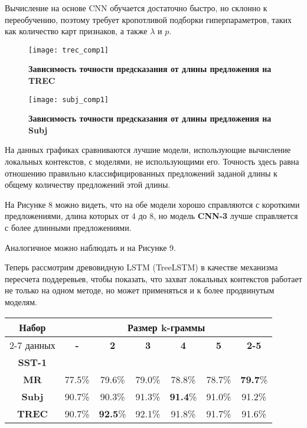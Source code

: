 Вычисление на основе CNN обучается достаточно быстро, но склонно к переобучению, поэтому требует кропотливой подборки гиперпараметров, таких как количество карт признаков, а также $\lambda$ и $p$.

\begin{figure}[H]
\texttt{[image: trec\_comp1]}
\caption{\textbf{Зависимость точности предсказания от длины предложения на TREC}}
\label{fig:context_ex}
\end{figure}

\begin{figure}[H]
\texttt{[image: subj\_comp1]}
\caption{\textbf{Зависимость точности предсказания от длины предложения на Subj}}
\label{fig:context_ex}
\end{figure}

\vspace{20mm}

На данных графиках сравниваются лучшие модели, использующие вычисление локальных контекстов, с моделями, не использующими его. Точность здесь равна отношению правильно классифицированных предложений заданой длины к общему количеству предложений этой длины. 

На Рисунке 8 можно видеть, что на обе модели хорошо справляются с короткими предложениями, длина которых от $4$ до $8$, но модель \textbf{CNN-3} лучше справляется с более длинными предложениями.

Аналогичное можно наблюдать и на Рисунке 9.

Теперь рассмотрим  древовидную LSTM (TreeLSTM) в качестве механизма пересчета поддеревьев, 
чтобы показать, что захват локальных контекстов работает не только на одном методе, 
но может применяться и к более продвинутым моделям.

\vspace{5mm}
\begin{minipage}{\linewidth}
 \label{tab:title} 
\begin{tabular}{|c|c|c|c|c|c|c|}
\hline
\multirow{2}{*}{Набор}   &                \multicolumn{6}{c|}{Размер k-граммы} \\ \cline{2-7} 
     данных              & \textbf{-} & \textbf{2} & \textbf{3} & \textbf{4} & \textbf{5} & \textbf{2-5} \\ \hline
\textbf{SST-1}           &            &            &            &            &            &        \\ \hline
\textbf{MR}              & 77.5\%     &  79.6\%    & 79.0\%     & 78.8\%     & 78.7\%     & \textbf{79.7}\% \\\hline
\textbf{Subj}            & 90.7\%     &  90.3\%    & 91.3\%     &\textbf{91.4}\%& 91.0\%     &  91.2\% \\\hline
\textbf{TREC}            & 90.7\%     &  \textbf{92.5}\%    & 92.1\%     & 91.8\%     & 91.7\%     &  91.6\% \\\hline
\end{tabular}
\end{minipage}
\vspace{5mm}

